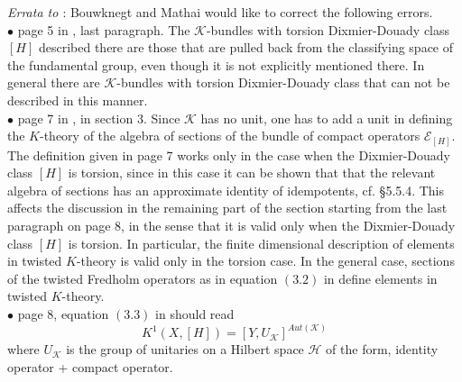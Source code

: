 \documentclass[a4paper,reqno]{amsart}
\theoremstyle{plain}
\theoremstyle{definition}
\theoremstyle{remark}
\numberwithin{equation}{section}
\numberwithin{figure}{section}
\newcommand{\UK}{U{_\mathcal K}}
\newcommand{\<}{\langle}
\renewcommand{\>}{\rangle}
\begin{document}
\bigskip \noindent
{\it Errata to \cite{BM}}: Bouwknegt and Mathai would like to correct
the following errors.\\
$\bullet$ page 5 in \cite{BM}, last paragraph. The $\mathcal
K$-bundles with torsion
Dixmier-Douady class $[H]$ described there are those that are pulled back
from the classifying space of the fundamental group, even though it is
not explicitly mentioned there. In general there are
$\mathcal K$-bundles with torsion
Dixmier-Douady class that can not be described in this manner.\\
$\bullet$ page 7 in \cite{BM}, in section 3. Since $\mathcal K$ has
no unit, one has
to add a unit in defining the $K$-theory of the algebra of sections
of the bundle of compact operators ${\mathcal E}_{[H]}$. The definition
given in page 7 works only in the case when the Dixmier-Douady class
$[H]$ is torsion, since in this case it can be shown that that the relevant
algebra of sections has
an approximate identity of idempotents, cf. \cite{Bla} \S 5.5.4.
This affects the discussion in the remaining part of the section
starting from the last paragraph on page 8, in
the sense that it is valid only when the Dixmier-Douady class $[H]$
is torsion. In particular, the finite dimensional description of
elements in twisted $K$-theory is valid only in the torsion case.
In the general case, sections of the twisted Fredholm
operators as in equation $(3.2)$ in \cite{BM} define elements in
twisted $K$-theory. \\
$\bullet$ page 8, equation $(3.3)$ in \cite{BM} should read
$$K^1(X, [H]) = [Y, \UK]^{Aut(\mathcal K)}$$
where $\UK$ is the group of unitaries on a
Hilbert space $\mathcal H$ of the form, identity operator
   + compact operator.
    
\end{document}
